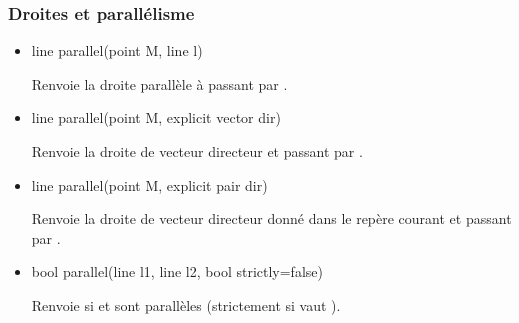 \documentclass[pdftex]{article}
\begin{document}
\subsubsection{Droites et parallélisme}
\begin{itemize}
\item {}%
    \begin{Vcolor}
    line parallel(point M, line l)
  \end{Vcolor}
  Renvoie la droite parallèle à  passant par .
\item {}%
    \begin{Vcolor}
    line parallel(point M, explicit vector dir)
  \end{Vcolor}
  Renvoie la droite de vecteur directeur  et passant par .
\item {}%
    \begin{Vcolor}
    line parallel(point M, explicit pair dir)
  \end{Vcolor}
  Renvoie la droite de vecteur directeur  donné dans le
  repère courant  et passant par .
\item {}%
    \begin{Vcolor}
    bool parallel(line l1, line l2, bool strictly=false)
  \end{Vcolor}
  Renvoie  si  et  sont parallèles
  (strictement si  vaut ).
\end{itemize}
\end{document}
